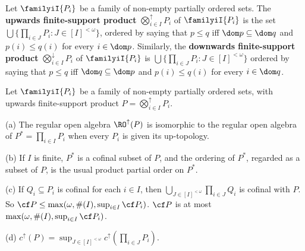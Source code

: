  Let $\familyiI{P_i}$ be a family of non-empty
partially ordered sets.   The {\bf upwards finite-support product}
$\bigotimes^{\uparrow}_{i\in I}P_i$ of $\familyiI{P_i}$ is the set
$\bigcup\{\prod_{i\in J}P_i:J\in[I]^{<\omega}\}$, ordered by saying that
$p\le q$ iff $\dom p\subseteq\dom q$ and $p(i)\le q(i)$ for every
$i\in\dom p$.   Similarly, the {\bf downwards finite-support product}
$\bigotimes^{\downarrow}_{i\in I}P_i$ of $\familyiI{P_i}$ is $\bigcup\{\prod_{i\in J}P_i:J\in[I]^{<\omega}\}$ ordered by saying that $p\le q$ iff $\dom q\subseteq\dom p$ and
$p(i)\le q(i)$ for every $i\in\dom q$.

 Let $\familyiI{P_i}$ be a family of
non-empty partially ordered sets, with upwards finite-support product
$P=\bigotimes^{\uparrow}_{i\in I}P_i$.

(a) The regular open algebra $\RO^{\uparrow}(P)$ is isomorphic to the
regular open algebra of $P^*=\prod_{i\in I}P_i$ when every $P_i$ is
given its up-topology.

(b) If $I$ is finite, $P^*$ is a cofinal subset of $P$, and the ordering
of $P^*$, regarded as a subset of $P$, is the usual product partial
order on $P^*$.

(c) If $Q_i\subseteq P_i$ is cofinal for each $i\in I$, then
$\bigcup_{J\in[I]^{<\omega}}\prod_{i\in J}Q_i$ is cofinal with $P$.   So
\ifnum{}$\cf P\le\max(\omega,\#(I),\sup_{i\in I}\cf P_i)$.
\else$\cf P$ is at most $\max(\omega,\#(I),\sup_{i\in I}\cf P_i)$.\fi

(d) $c^{\uparrow}(P)
=\sup_{J\in[I]^{<\omega}}c^{\uparrow}(\prod_{i\in J}P_i)$.

